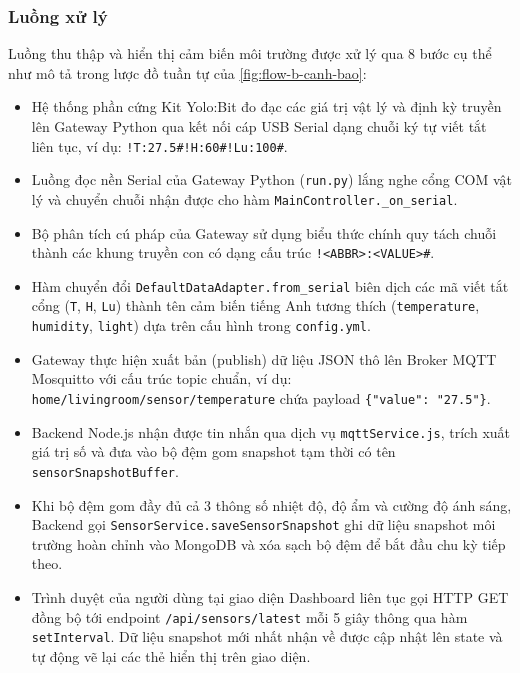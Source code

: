\subsubsection{Luồng xử lý}
Luồng thu thập và hiển thị cảm biến môi trường được xử lý qua 8 bước cụ thể như mô tả trong lược đồ tuần tự của \autoref{fig:flow-b-canh-bao}:
\begin{itemize}
    \item Hệ thống phần cứng Kit Yolo:Bit đo đạc các giá trị vật lý và định kỳ truyền lên Gateway Python qua kết nối cáp USB Serial dạng chuỗi ký tự viết tắt liên tục, ví dụ: \texttt{!T:27.5\#!H:60\#!Lu:100\#}.
    \item Luồng đọc nền Serial của Gateway Python (\texttt{run.py}) lắng nghe cổng COM vật lý và chuyển chuỗi nhận được cho hàm \texttt{MainController.\_on\_serial}.
    \item Bộ phân tích cú pháp của Gateway sử dụng biểu thức chính quy tách chuỗi thành các khung truyền con có dạng cấu trúc \texttt{!<ABBR>:<VALUE>\#}.
    \item Hàm chuyển đổi \texttt{DefaultDataAdapter.from\_serial} biên dịch các mã viết tắt cổng (\texttt{T}, \texttt{H}, \texttt{Lu}) thành tên cảm biến tiếng Anh tương thích (\texttt{temperature}, \texttt{humidity}, \texttt{light}) dựa trên cấu hình trong \texttt{config.yml}.
    \item Gateway thực hiện xuất bản (publish) dữ liệu JSON thô lên Broker MQTT Mosquitto với cấu trúc topic chuẩn, ví dụ: \texttt{home/livingroom/sensor/temperature} chứa payload \texttt{\{"value": "27.5"\}}.
    \item Backend Node.js nhận được tin nhắn qua dịch vụ \texttt{mqttService.js}, trích xuất giá trị số và đưa vào bộ đệm gom snapshot tạm thời có tên \texttt{sensorSnapshotBuffer}.
    \item Khi bộ đệm gom đầy đủ cả 3 thông số nhiệt độ, độ ẩm và cường độ ánh sáng, Backend gọi \texttt{SensorService.saveSensorSnapshot} ghi dữ liệu snapshot môi trường hoàn chỉnh vào MongoDB và xóa sạch bộ đệm để bắt đầu chu kỳ tiếp theo.
    \item Trình duyệt của người dùng tại giao diện Dashboard liên tục gọi HTTP GET đồng bộ tới endpoint \texttt{/api/sensors/latest} mỗi 5 giây thông qua hàm \texttt{setInterval}. Dữ liệu snapshot mới nhất nhận về được cập nhật lên state và tự động vẽ lại các thẻ hiển thị trên giao diện.
\end{itemize}


